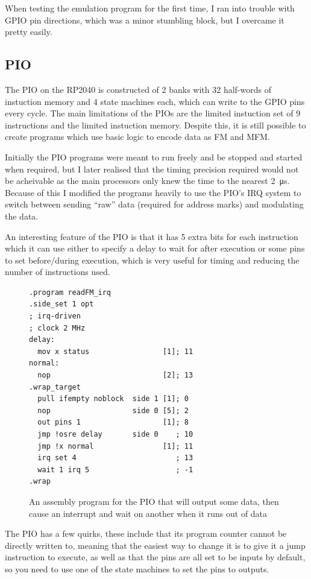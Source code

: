 \documentclass[a4paper]{article}
\begin{document}
When testing the emulation program for the first time, I ran into
trouble with GPIO pin directions, which was a minor stumbling block,
but I overcame it pretty easily.

\subsection{PIO}

The PIO on the RP2040 is constructed of 2 banks with 32 half-words of
instuction memory and 4 state machines each, which can write to the
GPIO pins every cycle. The main limitations of the PIOs are the
limited instuction set of 9 instructions and the limited instuction
memory. Despite this, it is still possible to create programs which
use basic logic to encode data as FM and MFM.

Initially the PIO programs were meant to run freely and be stopped and
started when required, but I later realised that the timing precision
required would not be acheivable as the main processors only knew the
time to the nearest \qty{2}{\us}. Because of this I modified the programs heavily to
use the PIO's IRQ system to switch between sending ``raw'' data
(required for address marks) and modulating the data.

An interesting feature of the PIO is that it has 5 extra bits for
each instruction which it can use either to specify a delay to wait
for after execution or some pins to set before/during execution, which
is very useful for timing and reducing the number of instructions used.

\begin{figure}
\begin{verbatim}
.program readFM_irq
.side_set 1 opt
; irq-driven
; clock 2 MHz
delay:
  mov x status                 [1]; 11
normal:
  nop                          [2]; 13 
.wrap_target
  pull ifempty noblock  side 1 [1]; 0
  nop                   side 0 [5]; 2
  out pins 1                   [1]; 8
  jmp !osre delay       side 0    ; 10
  jmp !x normal                [1]; 11
  irq set 4                       ; 13
  wait 1 irq 5                    ; -1
.wrap
\end{verbatim}
  \caption{An assembly program for the PIO that will output some data,
    then cause an interrupt and wait on another when it runs out of data}
\end{figure}

The PIO has a few quirks, these include that its program counter
cannot be directly written to, meaning that the easiest way to change
it is to give it a jump instruction to execute, as well as that the
pins are all set to be inputs by default, so you need to use one of
the state machines to set the pins to outputs.
\end{document}
